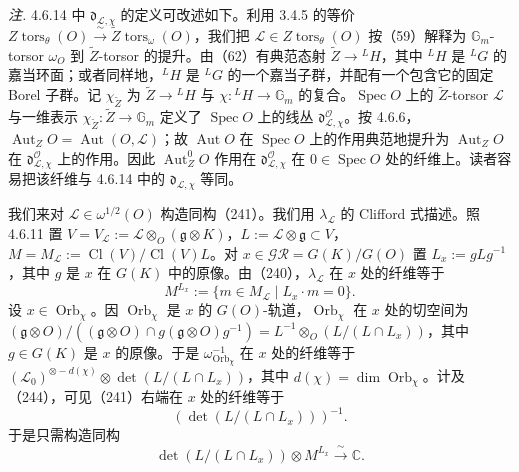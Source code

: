 
 \emph{注.} 4.6.14 中 $\mathfrak{d}_{\mathcal{L},\chi}$ 的定义可改述如下。利用 3.4.5 的等价 $Z\operatorname{tors}_\theta(O)\xrightarrow{\ \sim\ }\widetilde{Z}\operatorname{tors}_\omega(O)$，我们把 $\mathcal{L}\in Z\operatorname{tors}_\theta(O)$ 按（59）解释为 $\mathbb{G}_m$-torsor $\omega_O$ 到 $\widetilde{Z}$-torsor 的提升。由（62）有典范态射 $\widetilde{Z}\to{}^{L}H$，其中 ${}^{L}H$ 是 ${}^{L}G$ 的嘉当环面；或者同样地，${}^{L}H$ 是 ${}^{L}G$ 的一个嘉当子群，并配有一个包含它的固定 Borel 子群。记 $\chi_{\widetilde{Z}}$ 为 $\widetilde{Z}\to{}^{L}H$ 与 $\chi:{}^{L}H\to\mathbb{G}_m$ 的复合。$\operatorname{Spec}O$ 上的 $\widetilde{Z}$-torsor $\mathcal{L}$ 与一维表示 $\chi_{\widetilde{Z}}:\widetilde{Z}\to\mathbb{G}_m$ 定义了 $\operatorname{Spec}O$ 上的线丛 $\mathfrak{d}^{\mathcal{O}}_{\mathcal{L},\chi}$。按 4.6.6，$\operatorname{Aut}_Z O=\operatorname{Aut}(O,\mathcal{L})$；故 $\operatorname{Aut}O$ 在 $\operatorname{Spec}O$ 上的作用典范地提升为 $\operatorname{Aut}_Z O$ 在 $\mathfrak{d}^{\mathcal{O}}_{\mathcal{L},\chi}$ 上的作用。因此 $\operatorname{Aut}^0_Z O$ 作用在 $\mathfrak{d}^{\mathcal{O}}_{\mathcal{L},\chi}$ 在 $0\in\operatorname{Spec}O$ 处的纤维上。读者容易把该纤维与 4.6.14 中的 $\mathfrak{d}_{\mathcal{L},\chi}$ 等同。

 我们来对 $\mathcal{L}\in\omega^{1/2}(O)$ 构造同构（241）。我们用 $\lambda_{\mathcal{L}}$ 的 Clifford 式描述。照 4.6.11 置 $V=V_{\mathcal{L}}:=\mathcal{L}\otimes_O(\mathfrak{g}\otimes K)$，$L:=\mathcal{L}\otimes\mathfrak{g}\subset V$，$M=M_{\mathcal{L}}:=\operatorname{Cl}(V)/\operatorname{Cl}(V)L$。对 $x\in\mathcal{GR}=G(K)/G(O)$ 置 $L_x:=gLg^{-1}$，其中 $g$ 是 $x$ 在 $G(K)$ 中的原像。由（240），$\lambda_{\mathcal{L}}$ 在 $x$ 处的纤维等于
\begin{equation}\tag{248}
M^{L_x}:=\{m\in M_{\mathcal{L}}\mid L_x\cdot m=0\}.
\end{equation}
设 $x\in\operatorname{Orb}_\chi$。因 $\operatorname{Orb}_\chi$ 是 $x$ 的 $G(O)$-轨道，$\operatorname{Orb}_\chi$ 在 $x$ 处的切空间为 $(\mathfrak{g}\otimes O)/((\mathfrak{g}\otimes O)\cap g(\mathfrak{g}\otimes O)g^{-1})=L^{-1}\otimes_O(L/(L\cap L_x))$，其中 $g\in G(K)$ 是 $x$ 的原像。于是 $\omega^{-1}_{\operatorname{Orb}_\chi}$ 在 $x$ 处的纤维等于 $(\mathcal{L}_0)^{\otimes-d(\chi)}\otimes\det({L/(L\cap L_x)})$，其中 $d(\chi)=\dim\operatorname{Orb}_\chi$。计及（244），可见（241）右端在 $x$ 处的纤维等于
\begin{equation}\tag{249}
(\det({L/(L\cap L_x)}))^{-1}.
\end{equation}
于是只需构造同构
\begin{equation}\tag{250}
\det({L/(L\cap L_x)})\otimes M^{L_x}\xrightarrow{\ \sim\ }\mathbb{C}.
\end{equation}

